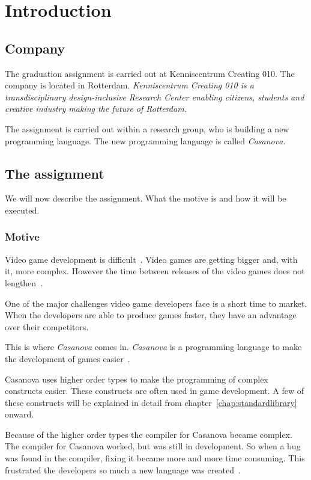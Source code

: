 \chapter{Introduction}
\section{Company}
The graduation assignment is carried out at Kenniscentrum Creating 010.
The company is located in Rotterdam.
\textit{Kenniscentrum Creating 010 is a transdisciplinary design-inclusive Research Center enabling citizens, students and creative industry making the future of Rotterdam}\cite{creating2016home}.

The assignment is carried out within a research group, who is building a new programming language.
The new programming language is called \emph{Casanova}.


\section{The assignment}
We will now describe the assignment.
What the motive is and how it will be executed.

\subsection{Motive}
Video game development is difficult~\cite{blow2004game}.
Video games are getting bigger and, with it, more complex.
However the time between releases of the video games does not lengthen~\cite{blow2004game}.

One of the major challenges video game developers face is a short time to market.
When the developers are able to produce games faster, they have an advantage over their competitors.

This is where \emph{Casanova} comes in.
\emph{Casanova} is a programming language to make the development of games easier~\cite{maggiore2011designing}.

Casanova uses higher order types to make the programming of complex constructs easier.
These constructs are often used in game development.
A few of these constructs will be explained in detail from chapter~\ref{chap:standardlibrary} onward.

Because of the higher order types the compiler for Casanova became complex.
The compiler for Casanova worked, but was still in development.
So when a bug was found in the compiler, fixing it became more and more time consuming.
This frustrated the developers so much a new language was created~\cite{giuseppe2015mc}.


